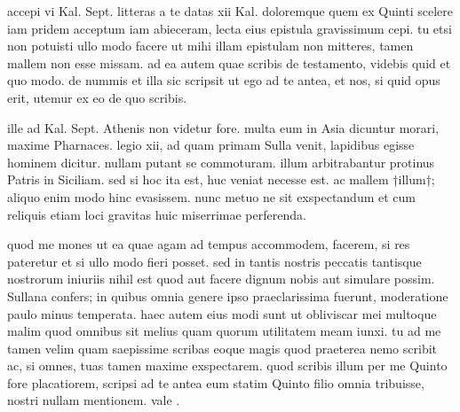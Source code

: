 


 accepi vi Kal. Sept. litteras a te datas xii Kal. doloremque quem ex Quinti scelere iam pridem acceptum iam abieceram, lecta eius epistula gravissimum cepi. tu etsi non potuisti ullo modo facere ut mihi illam epistulam non mitteres, tamen mallem non esse missam. ad ea autem quae scribis de testamento, videbis quid et quo modo. de nummis et illa sic scripsit ut ego ad te antea, et nos, si quid opus erit, utemur ex eo de quo scribis.

 ille ad Kal. Sept. Athenis non videtur fore. multa eum in Asia dicuntur morari, maxime Pharnaces. legio xii, ad quam primam Sulla venit, lapidibus egisse hominem dicitur. nullam putant se commoturam. illum arbitrabantur protinus Patris in Siciliam. sed si hoc ita est, huc veniat necesse est. ac mallem †illum†; aliquo enim modo hinc evasissem. nunc metuo ne sit exspectandum et cum reliquis etiam loci gravitas huic miserrimae perferenda.

 quod me mones ut ea quae agam ad tempus accommodem, facerem, si res pateretur et si ullo modo fieri posset. sed in tantis nostris peccatis tantisque nostrorum iniuriis nihil est quod aut facere dignum nobis aut simulare possim. Sullana confers; in quibus omnia genere ipso praeclarissima fuerunt, moderatione paulo minus temperata. haec autem eius modi sunt ut obliviscar mei multoque malim quod omnibus sit melius quam quorum utilitatem meam iunxi. tu ad me tamen velim quam saepissime scribas eoque magis quod praeterea nemo scribit ac, si omnes, tuas tamen maxime exspectarem. quod scribis illum per me Quinto fore placatiorem, scripsi ad te antea eum statim Quinto filio omnia tribuisse, nostri nullam mentionem. vale .
